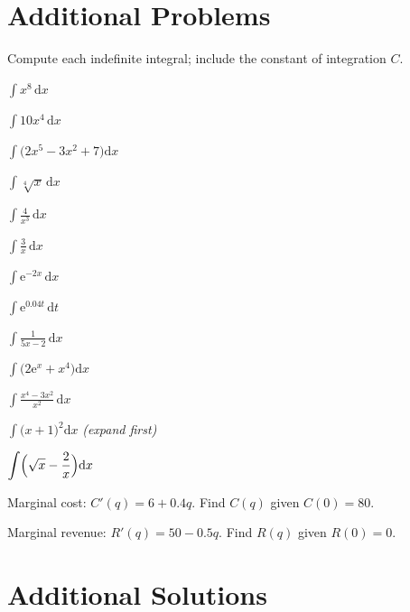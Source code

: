 \section{Additional Problems}

Compute each indefinite integral; include the constant of integration $C$.

\begin{problems}
  \item $\displaystyle\int x^{8}\,\mathrm{d}x$
  \item $\displaystyle\int 10x^{4}\,\mathrm{d}x$
  \item $\displaystyle\int \bigl(2x^{5}-3x^{2}+7\bigr)\mathrm{d}x$
  \item $\displaystyle\int \sqrt[4]{x}\,\mathrm{d}x$
  \item $\displaystyle\int \frac{4}{x^{3}}\,\mathrm{d}x$
  \item $\displaystyle\int \frac{3}{x}\,\mathrm{d}x$
  \item $\displaystyle\int \mathrm{e}^{-2x}\,\mathrm{d}x$
  \item $\displaystyle\int \mathrm{e}^{0.04t}\,\mathrm{d}t$
  \item $\displaystyle\int \frac{1}{5x-2}\,\mathrm{d}x$
  \item $\displaystyle\int \bigl(2\mathrm{e}^{x}+x^{4}\bigr)\mathrm{d}x$
  \item $\displaystyle\int \frac{x^{4}-3x^{2}}{x^{2}}\,\mathrm{d}x$
  \item $\displaystyle\int \bigl(x+1\bigr)^{2}\mathrm{d}x$
        \quad \emph{(expand first)}
  \item $\displaystyle\int \Bigl(\sqrt{x}-\frac{2}{x}\Bigr)\mathrm{d}x$
  \item Marginal cost: $C'(q)=6+0.4q$. Find $C(q)$ given $C(0)=80$.
  \item Marginal revenue: $R'(q)=50-0.5q$. Find $R(q)$ given $R(0)=0$.
\end{problems}

\section{Additional Solutions}

